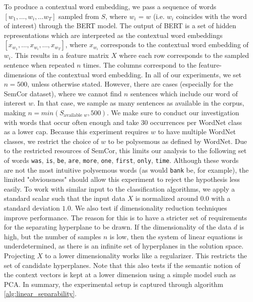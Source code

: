 \documentclass[a4paper,12pt,oneside,openright]{report}
\begin{document}
To produce a contextual word embedding, we pass a sequence of words $[w_1, \ldots, w_i, \ldots w_T]$ sampled from $S$, where $w_i$ = $w$ (i.e. $w_i$ coincides with the word of interest) through the BERT model.
The output of BERT is a set of hidden representations which are interpreted as the contextual word embeddings $[x_{w_1}, \ldots, x_{w_i}, \ldots, x_{w_T}]$, where $x_{w_i}$ corresponds to the contextual word embedding of $w_i$.
This results in a feature matrix $X$ where each row corresponds to the sampled sentence when repeated $n$ times.
The columns correspond to the feature-dimensions of the contextual word embedding.
In all of our experiments, we set $n=500$, unless otherwise stated.
However, there are cases (especially for the SemCor dataset), where we cannot find $n$ sentences which include our word of interest $w$. 
In that case, we sample as many sentences as available in the corpus, making $n=min( S_{\text{available }w}, 500)$.
We make sure to conduct our investigation with words that occur often enough and take 30 occurrences per WordNet class as a lower cap.
Because this experiment requires $w$ to have multiple WordNet classes, we restrict the choice of $w$ to be polysemous as defined by WordNet.
Due to the restricted resources of SemCor, this limits our analysis to the following set of words \texttt{was}, \texttt{is}, \texttt{be}, \texttt{are}, \texttt{more}, \texttt{one}, \texttt{first}, \texttt{only}, \texttt{time}.
Although these words are not the most intuitive polysemous words (as would \Verb#bank# be, for example), the limited "obviousness" should allow this experiment to reject the hypothesis less easily.
To work with similar input to the classification algorithms, we apply a standard scalar such that the input data $X$ is normalized around $0.0$ with a standard deviation $1.0$.
We also test if dimensionality reduction techniques improve  performance.
The reason for this is to have a stricter set of requirements for the separating hyperplane to be drawn.
If the dimensionality of the data $d$ is high, but the number of samples $n$ is low, then the system of linear equations is underdetermined, as there is an infinite set of hyperplanes in the solution space.
Projecting $X$ to a lower dimensionality works like a regularizer. This restricts the set of candidate hyperplanes.
Note that this also tests if the semantic notion of the context vectors is kept at a lower dimension using a simple model such as PCA.
In summary, the experimental setup is captured through algorithm \ref{alg:linear_separability}. \\
\end{document}
